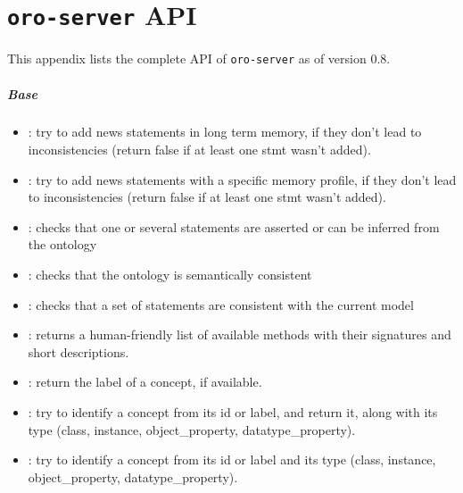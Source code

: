 \chapter{{\tt oro-server} API}
\label{chapt|oro-api}

This appendix lists the complete API of {\tt oro-server} as of version 0.8.

\paragraph{Base}
\begin{itemize}

    \item {}: try to add news statements in long term
    memory, if they don't lead to inconsistencies (return false if at least one
    stmt wasn't added).

    \item {}: try to add news statements with a
    specific memory profile, if they don't lead to inconsistencies (return
    false if at least one stmt wasn't added).

    \item {}: checks that one or several statements are
    asserted or can be inferred from the ontology

    \item {}: checks that the ontology is
    semantically consistent

    \item {}: checks that a set of statements
    are consistent with the current model

    \item {}: returns a human-friendly list of available
    methods with their signatures and short descriptions.

    \item {}: return the label of a concept, if
    available.

    \item {}: try to identify a concept from its id or
    label, and return it, along with its type (class, instance,
    object\_property, datatype\_property).

    \item {}: try to identify a concept from
    its id or label and its type (class, instance, object\_property,
    datatype\_property).


\end{itemize}
